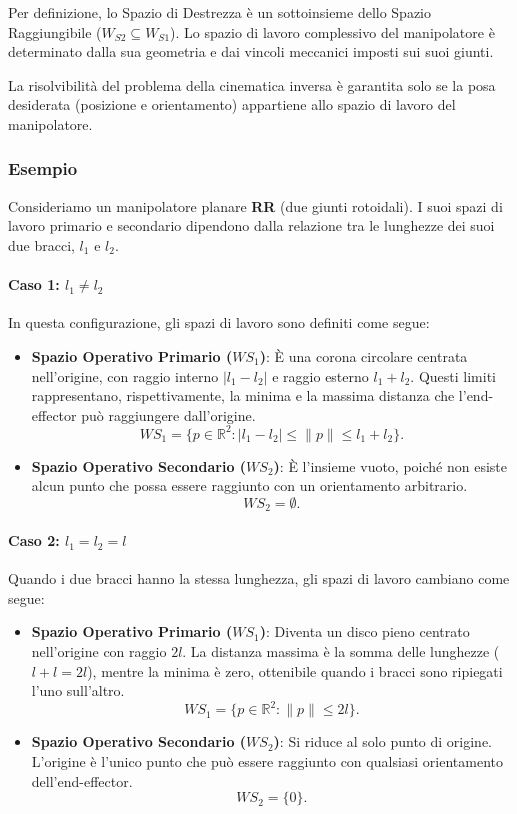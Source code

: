 ﻿\documentclass[11pt, a4paper]{article}
\begin{document}
Per definizione, lo Spazio di Destrezza è un sottoinsieme dello Spazio Raggiungibile (\( W_{S2} \subseteq W_{S1} \)). Lo spazio di lavoro complessivo del manipolatore è determinato dalla sua geometria e dai vincoli meccanici imposti sui suoi giunti.

La risolvibilità del problema della cinematica inversa è garantita solo se la posa desiderata (posizione e orientamento) appartiene allo spazio di lavoro del manipolatore.

\subsubsection*{Esempio}
Consideriamo un manipolatore planare \textbf{RR} (due giunti rotoidali). I suoi spazi di lavoro primario e secondario dipendono dalla relazione tra le lunghezze dei suoi due bracci, \( l_1 \) e \( l_2 \).

\paragraph{Caso 1: \(l_1 \neq l_2\)}
In questa configurazione, gli spazi di lavoro sono definiti come segue:
\begin{itemize}
    \item \textbf{Spazio Operativo Primario (\(WS_1\))}: È una corona circolare centrata nell'origine, con raggio interno \(|l_1 - l_2|\) e raggio esterno \(l_1 + l_2\). Questi limiti rappresentano, rispettivamente, la minima e la massima distanza che l'end-effector può raggiungere dall'origine.
    $$
        WS_{1} = \big\{ p \in \mathbb{R}^2 : |l_{1} - l_{2}| \leq \|p\| \leq l_{1} + l_{2} \big\}.
    $$

    \item \textbf{Spazio Operativo Secondario (\(WS_2\))}: È l'insieme vuoto, poiché non esiste alcun punto che possa essere raggiunto con un orientamento arbitrario.
    $$
    WS_2 = \emptyset.
    $$
\end{itemize}

\paragraph{Caso 2: \(l_1 = l_2 = l\)}
Quando i due bracci hanno la stessa lunghezza, gli spazi di lavoro cambiano come segue:
\begin{itemize}
    \item \textbf{Spazio Operativo Primario (\(WS_1\))}: Diventa un disco pieno centrato nell'origine con raggio \(2l\). La distanza massima è la somma delle lunghezze (\(l+l=2l\)), mentre la minima è zero, ottenibile quando i bracci sono ripiegati l'uno sull'altro.
    $$
    WS_1 = \big\{ p \in \mathbb{R}^2 : \|p\| \leq 2l \big\}.
    $$

    \item \textbf{Spazio Operativo Secondario (\(WS_2\))}: Si riduce al solo punto di origine. L'origine è l'unico punto che può essere raggiunto con qualsiasi orientamento dell'end-effector.
    $$
    WS_2 = \{0\}.
    $$
\end{itemize}
\end{document}
